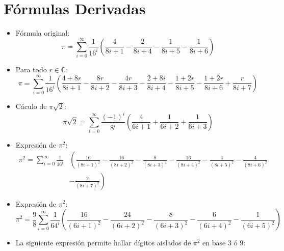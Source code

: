 
\section{Fórmulas Derivadas}

\begin{itemize}
\item   Fórmula original:
  \begin{equation*}
    \pi = \sum_{i=0}^{\infty}\frac{1}{16^{i}}
    \left(
      \frac{4}{8i+1}
      -\frac{2}{8i+4}
      -\frac{1}{8i+5}
      -\frac{1}{8i+6}
    \right)
  \end{equation*}
\item Para todo $r\in\mathbb{C}$:
  \begin{equation*}
    \pi = \sum_{i=0}^{\infty}\frac{1}{16^{i}}
    \left(
      \frac{4+8r}{8i+1}
      -\frac{8r}{8i+2}
      -\frac{4r}{8i+3}
      -\frac{2+8i}{8i+4}
      -\frac{1+2r}{8i+5}
      -\frac{1+2r}{8i+6}
      +\frac{r}{8i+7}
    \right)
  \end{equation*} 
\item Cáculo de $\pi\sqrt{2}$:
  \begin{equation*}
    \pi\sqrt{2} = \sum_{i=0}^{\infty}\frac{(-1)^{i}}{8^{i}}
    \left(
      \frac{4}{6i+1}
      +\frac{1}{6i+2}
      +\frac{1}{6i+3}
    \right)
  \end{equation*}
\item Expresión de $\pi^{2}$:
  \begin{align*}
    \pi^{2}= \sum_{i=0}^{\infty}\frac{1}{16^{i}}&
      \left(
        \frac{16}{(8i+1)^{2}}
        -\frac{16}{(8i+2)^{2}}
        -\frac{8}{(8i+3)^{2}}
        -\frac{16}{(8i+4)^{2}}
        -\frac{4}{(8i+5)^{2}}
        -\frac{4}{(8i+6)^{2}}\right.\\
        &\left.-\frac{2}{(8i+7)^{2}}\right)
  \end{align*}
\item Expresión de $\pi^{2}$:
  \begin{equation*}
    \pi^{2}=\frac{9}{8}\sum_{i=0}^{\infty}\frac{1}{64^{i}}
    \left(
      \frac{16}{(6i+1)^{2}}
      -\frac{24}{(6i+2)^{2}}
      -\frac{8}{(6i+3)^{2}}
      -\frac{6}{(6i+4)^{2}}
      -\frac{1}{(6i+5)^{2}}
    \right)
  \end{equation*}
\item La siguiente expresión permite hallar dígitos aislados de
  $\pi^{2}$ en base $3$ ó $9$:
  \begin{align*}

\end{align*}
\end{itemize}
